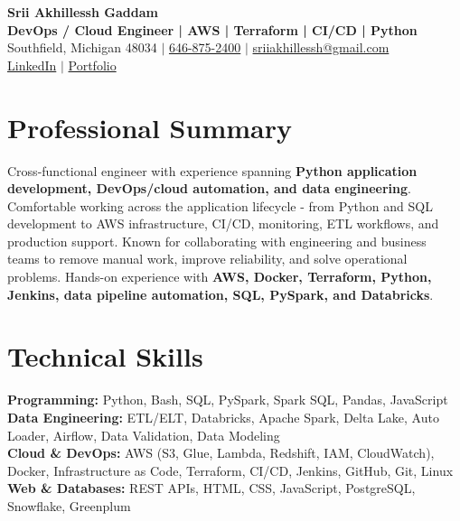 \documentclass[letterpaper,10pt]{article}
\begin{document}
\fontsize{9.35pt}{10.45pt}\selectfont

\begin{center}
    {\LARGE \textbf{Srii Akhillessh Gaddam}} \\[-1pt]
    \textbf{DevOps / Cloud Engineer | AWS | Terraform | CI/CD | Python} \\[2pt]
    Southfield, Michigan 48034 $|$
    \href{tel:6468752400}{646-875-2400} $|$
    \href{mailto:sriiakhillessh@gmail.com}{sriiakhillessh@gmail.com} \\[1pt]
    \href{https://www.linkedin.com/in/srii-akhiilessh-gaddam-b48668191/}{LinkedIn} $|$
    \href{https://sriiakhillesshg.github.io/portfolio/}{Portfolio}
\end{center}
\vspace{-8pt}

\section{Professional Summary}
\small{Cross-functional engineer with experience spanning \textbf{Python application development, DevOps/cloud automation, and data engineering}. Comfortable working across the application lifecycle - from Python and SQL development to AWS infrastructure, CI/CD, monitoring, ETL workflows, and production support. Known for collaborating with engineering and business teams to remove manual work, improve reliability, and solve operational problems. Hands-on experience with \textbf{AWS, Docker, Terraform, Python, Jenkins, data pipeline automation, SQL, PySpark, and Databricks}.}

\section{Technical Skills}
\small{
\textbf{Programming:} Python, Bash, SQL, PySpark, Spark SQL, Pandas, JavaScript \\
\textbf{Data Engineering:} ETL/ELT, Databricks, Apache Spark, Delta Lake, Auto Loader, Airflow, Data Validation, Data Modeling \\
\textbf{Cloud \& DevOps:} AWS (S3, Glue, Lambda, Redshift, IAM, CloudWatch), Docker, Infrastructure as Code, Terraform, CI/CD, Jenkins, GitHub, Git, Linux \\
\textbf{Web \& Databases:} REST APIs, HTML, CSS, JavaScript, PostgreSQL, Snowflake, Greenplum
}
\end{document}
